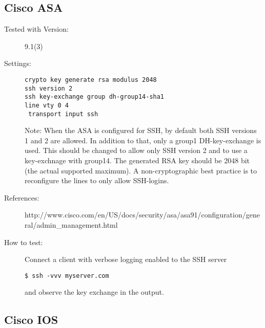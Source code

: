 \subsection{Cisco ASA}


\begin{description}
\item[Tested with Version:]9.1(3) 

\item[Settings:] \mbox{}
\begin{lstlisting}[breaklines]
crypto key generate rsa modulus 2048
ssh version 2
ssh key-exchange group dh-group14-sha1
line vty 0 4
 transport input ssh
\end{lstlisting}
Note: When the ASA is configured for SSH, by default both SSH versions 1 and 2 are allowed. In addition to that, only a group1 DH-key-exchange is used. This should be changed to allow only SSH version 2 and to use a key-exchnage with group14. The generated RSA key should be 2048 bit (the actual supported maximum). A non-cryptographic best practice is to reconfigure the lines to only allow SSH-logins.
\item[References:]
http://www.cisco.com/en/US/docs/security/asa/asa91/configuration/general/admin\_management.html 


\item[How to test:]
Connect a client with verbose logging enabled to the SSH server \\
\begin{lstlisting}[breaklines]
$ ssh -vvv myserver.com
\end{lstlisting}and observe the key exchange in the output.
\end{description}


\subsection{Cisco IOS}


